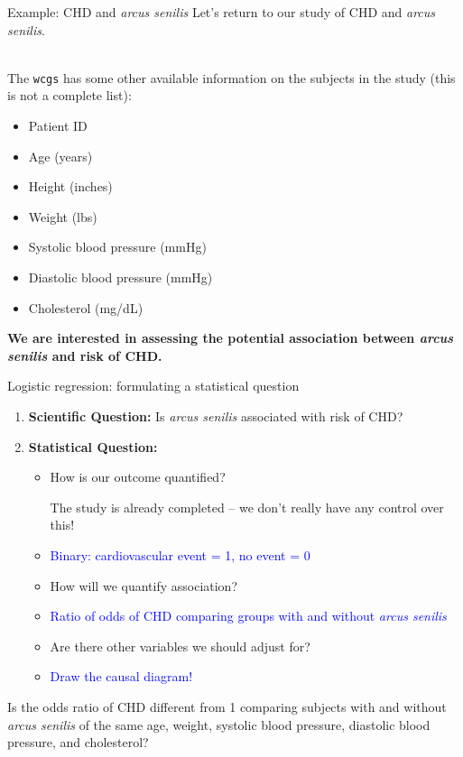 \documentclass[10pt,t]{beamer}
\begin{document}
\begin{frame}{Example: CHD and \textit{arcus senilis}}
	Let's return to our study of CHD and \textit{arcus senilis}.
	\\ ~\
	
	The \texttt{wcgs} has some other available information on the subjects in the study (this is not a complete list):
	\begin{itemize}
		\item Patient ID
		\item Age (years)
		\item Height (inches)
		\item Weight (lbs)
		\item Systolic blood pressure (mmHg)
		\item Diastolic blood pressure (mmHg)
		\item Cholesterol (mg/dL)
	\end{itemize}  

	\textbf{We are interested in assessing the potential association between \textit{arcus senilis} and risk of CHD.} 
\end{frame}

\begin{frame}{Logistic regression: formulating a statistical question}
	\begin{enumerate}
		\item \textbf{Scientific Question:} \pause Is \textit{arcus senilis} associated with risk of CHD? \pause
		\item \textbf{Statistical Question:} \pause 
		\begin{itemize}
			\item How is our outcome quantified? \begin{tiny}The study is already completed -- we don't really have any control over this!\end{tiny}\pause
			\item[] \textcolor{blue}{Binary: cardiovascular event = 1, no event = 0}\pause
			\item How will we quantify association? \pause
			\item[] \textcolor{blue}{Ratio of odds of CHD comparing groups with and without \textit{arcus senilis}}\pause
			\item Are there other variables we should adjust for?\pause
			\item[] \textcolor{blue}{Draw the causal diagram!}\pause
		\end{itemize}
	\end{enumerate}\pause
\vspace{1cm}
Is the odds ratio of CHD different from 1 comparing subjects with and without \textit{arcus senilis} of the same age, weight, systolic blood pressure, diastolic blood pressure, and cholesterol? 
\end{frame}
\end{document}
